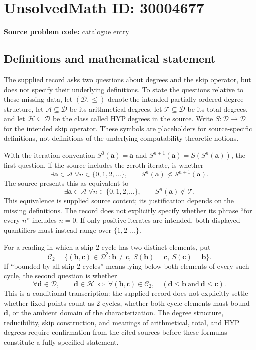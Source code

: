 \documentclass[11pt]{article}
\begin{document}
\section*{UnsolvedMath ID: 30004677}
\textbf{Source problem code:} catalogue entry
\subsection{Definitions and mathematical statement}
The supplied record asks two questions about degrees and the skip operator, but does not specify their underlying definitions. To state the questions relative to these missing data, let \((\mathcal D,\leq)\) denote the intended partially ordered degree structure, let \(\mathcal A\subseteq\mathcal D\) be its arithmetical degrees, let \(\mathcal T\subseteq\mathcal D\) be its total degrees, and let \(\mathcal H\subseteq\mathcal D\) be the class called HYP degrees in the source. Write \(S:\mathcal D\to\mathcal D\) for the intended skip operator. These symbols are placeholders for source-specific definitions, not definitions of the underlying computability-theoretic notions.

With the iteration convention \(S^0(\mathbf a)=\mathbf a\) and \(S^{n+1}(\mathbf a)=S(S^n(\mathbf a))\), the first question, if the source includes the zeroth iterate, is whether
\[
\exists\mathbf a\in\mathcal A\;\forall n\in\{0,1,2,\ldots\},\qquad S^n(\mathbf a)\not\leq S^{n+1}(\mathbf a).
\]
The source presents this as equivalent to
\[
\exists\mathbf a\in\mathcal A\;\forall n\in\{0,1,2,\ldots\},\qquad S^n(\mathbf a)\notin\mathcal T.
\]
This equivalence is supplied source content; its justification depends on the missing definitions. The record does not explicitly specify whether its phrase ``for every \(n\)'' includes \(n=0\). If only positive iterates are intended, both displayed quantifiers must instead range over \(\{1,2,\ldots\}\).

For a reading in which a skip \(2\)-cycle has two distinct elements, put
\[
\mathcal C_2=\{(\mathbf b,\mathbf c)\in\mathcal D^2:\mathbf b\ne\mathbf c,\ S(\mathbf b)=\mathbf c,\ S(\mathbf c)=\mathbf b\}.
\]
If ``bounded by all skip \(2\)-cycles'' means lying below both elements of every such cycle, the second question is whether
\[
\forall\mathbf d\in\mathcal D,\qquad
\mathbf d\in\mathcal H
\ \Longleftrightarrow\
\forall(\mathbf b,\mathbf c)\in\mathcal C_2,\quad
(\mathbf d\leq\mathbf b\ \text{and}\ \mathbf d\leq\mathbf c).
\]
This is a conditional transcription: the supplied record does not explicitly settle whether fixed points count as \(2\)-cycles, whether both cycle elements must bound \(\mathbf d\), or the ambient domain of the characterization. The degree structure, reducibility, skip construction, and meanings of arithmetical, total, and HYP degrees require confirmation from the cited sources before these formulas constitute a fully specified statement.
\end{document}

